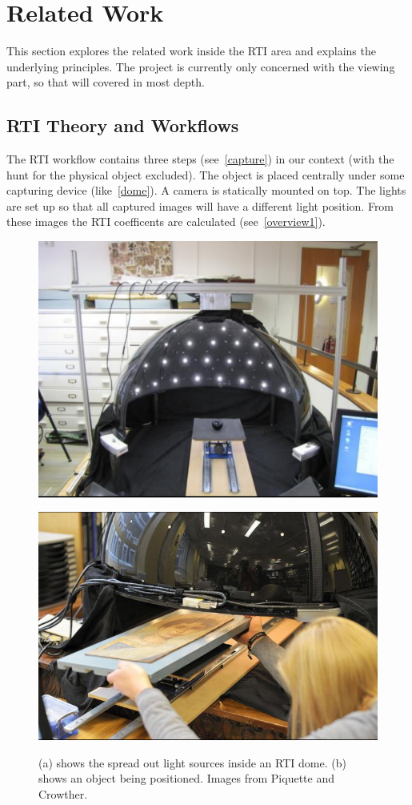 \section{Related Work}
This section explores the related work inside the RTI area and explains the
underlying principles. The project is currently only concerned with the viewing
part, so that will covered in most depth.

\subsection{RTI Theory and Workflows}

The RTI workflow contains three steps (see~\autoref{capture}) in our context
(with the hunt for the physical object excluded). The object is placed centrally under
some capturing device (like~\autoref{dome}). A camera is
statically mounted on top. The lights are set up so that all captured images will have a different light position. From these
images the RTI coefficents are calculated (see~\autoref{overview1}).


\begin{figure}
\begin{subfloat}[]{\includegraphics[max width=0.5\linewidth]{images/rtiaction1}}\end{subfloat}
\begin{subfloat}[]{\includegraphics[max width=0.5\linewidth]{images/rtiaction2}}\end{subfloat}
\caption[RTI in Action]{(a) shows the spread out light sources inside an RTI
  dome. (b) shows an object being positioned. Images from Piquette and Crowther.\cite*{piquette_developing_2011}}
\label{dome}
\end{figure}


